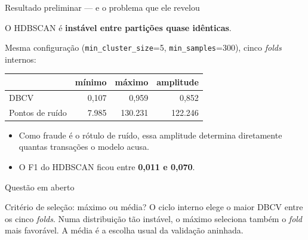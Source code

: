 \documentclass[aspectratio=169,11pt]{beamer}
\begin{document}
\begin{frame}{Resultado preliminar --- e o problema que ele revelou}

    O HDBSCAN é \textbf{instável entre partições quase idênticas}.

    \bigskip
    Mesma configuração (\texttt{min\_cluster\_size}=5,
    \texttt{min\_samples}=300), cinco \textit{folds} internos:

    \begin{center}
    \begin{tabular}{lrrr}
        \toprule
         & \textbf{mínimo} & \textbf{máximo} & \textbf{amplitude} \\
        \midrule
        DBCV                & 0,107 & 0,959 & 0,852 \\
        Pontos de ruído     & 7.985 & 130.231 & 122.246 \\
        \bottomrule
    \end{tabular}
    \end{center}

    \bigskip
    \begin{itemize}
        \item Como fraude é o rótulo de ruído, essa amplitude determina
              diretamente quantas transações o modelo acusa.
        \item O F1 do HDBSCAN ficou entre \textbf{0,011 e 0,070}.
    \end{itemize}

\end{frame}

\begin{frame}{Questão em aberto}

    \begin{block}{Critério de seleção: máximo ou média?}
        O ciclo interno elege o maior DBCV entre os cinco \textit{folds}. Numa
        distribuição tão instável, o máximo seleciona também o \textit{fold}
        mais favorável. A média é a escolha usual da validação aninhada.
    \end{block}

\end{frame}
\end{document}
